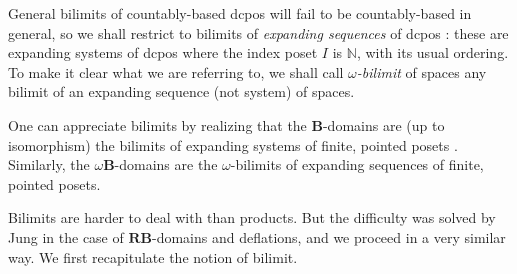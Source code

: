 \documentclass{LMCS}
\newcommand\nat{\mathbb{N}}
\newcommand\B{\mathbf{B}}
\newcommand\RB{\mathbf{RB}}
\begin{document}
General bilimits of countably-based dcpos will fail to be
countably-based in general, so we shall restrict to bilimits of
\emph{expanding sequences} of dcpos
\cite[Definition~3.3.6]{AJ:domains}: these are expanding systems of
dcpos where the index poset $I$ is $\nat$, with its usual ordering.
To make it clear what we are referring to, we shall call
\emph{$\omega$-bilimit} of spaces any bilimit of an expanding sequence
(not system) of spaces.

One can appreciate bilimits by realizing that the $\B$-domains are (up
to isomorphism) the bilimits of expanding systems of finite, pointed
posets \cite[Theorem~4.2.7]{AJ:domains}.  Similarly, the
$\omega\B$-domains are the $\omega$-bilimits of expanding sequences of
finite, pointed posets.

Bilimits are harder to deal with than products.  But the difficulty
was solved by Jung \cite[Section~4.1]{Jung:CCC} in the case of
$\RB$-domains and deflations, and we proceed in a very similar way.
We first recapitulate the notion of bilimit.
\end{document}
